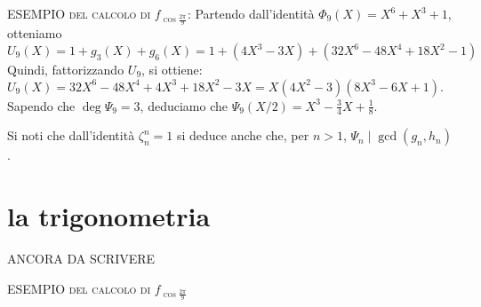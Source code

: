 \documentclass[a4paper,10pt]{article}
\begin{document}
\noindent\textsc{ESEMPIO del calcolo di $f_{\cos\frac{2\pi}9}$}: Partendo dall'identità $\Phi_9(X)=X^6+X^3+1$, otteniamo
$$U_9(X)=1+g_3(X)+g_6(X)=1+(4X^3 - 3X)+(32X^6 - 48X^4 + 18X^2 - 1)$$
Quindi, fattorizzando $U_9$, si ottiene: 
$U_9(X)=32 X^6
 - 48 X^4
 + 4 X^3
 + 18 X^2
 - 3 X=X(4X^2-3)(8X^3 - 6X + 1).$ Sapendo che $\deg\Psi_{9}=3$, deduciamo che $\Psi_{9}(X/2)=X^3-\frac{3}{4}X+\frac{1}{8}.$

Si noti che dall'identità $\zeta_n^n=1$ si deduce anche che, per $n>1$,
$\Psi_{n}\mid\gcd(g_n,h_n)$.

\section{la trigonometria}

ANCORA DA SCRIVERE
\medskip
  
\noindent\textsc{ESEMPIO del calcolo di $f_{\cos\frac{2\pi}9}$}  
\end{document}

